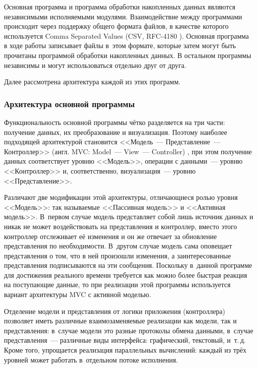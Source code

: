 \documentclass[a4paper, 14pt, titlepage]{extarticle}
\newcommand{\eng}[1]{\foreignlanguage{english}{#1}}
\begin{document}
  Основная программа и программа обработки накопленных данных являются независимыми исполняемыми
  модулями. Взаимодействие между программами происходит через поддержку общего формата файлов, в
  качестве которого используется \eng{Comma Separated Values} (CSV, RFC-4180 \cite{rfc4180}).
  Основная программа в ходе работы записывает файлы в~этом формате, которые затем могут быть прочитаны
  программой обработки накопленных данных. В остальном программы независимы и могут использоваться
  отдельно друг от друга.

  Далее рассмотрена архитектура каждой из этих программ.

  \subsubsection{Архитектура основной программы}\label{sssec:main-arch}

  Функциональность основной программы чётко разделяется на три части: получение данных, их
  преобразование и визуализация. Поэтому наиболее подходящей архитектурой становится
  <<Модель~--- Представление~--- Контроллер>> (англ. \eng{MVC: Model~--- View~--- Controller})
  \cite{gamma-patterns}, при этом получение данных соответствует уровню <<Модель>>, операции с
  данными~--- уровню <<Контроллер>> и, соответственно, визуализация~--- уровню <<Представление>>.

  Различают две модификации этой архитектуры, отличающиеся ролью уровня <<Модель>>: так называемые
  <<Пассивная модель>> и <<Активная модель>>. В~первом случае модель представляет собой лишь
  источник данных и никак не может воздействовать на представления и контроллер, вместо этого
  контроллер отслеживает её изменения и он же отвечает за обновление представления по необходимости.
  В~другом случае модель сама оповещает представления о том, что в ней произошли изменения, а
  заинтересованные представления подписываются на эти сообщения. Поскольку в~данной программе для
  достижения реального времени требуется как можно более быстрая реакция на поступающие данные, то
  при реализации этой программы используется вариант архитектуры MVC с активной моделью.

  Отделение модели и представления от логики приложения (контроллера) позволяет иметь различные
  взаимозаменяемые реализации как модели, так и представления: в~случае модели это разные протоколы
  обмена данными, в~случае представления~--- различные виды интерфейса: графический, текстовый, и~т.\,д.
  Кроме того, упрощается реализация параллельных вычислений: каждый из трёх уровней может работать
  в~отдельном потоке исполнения.
\end{document}
